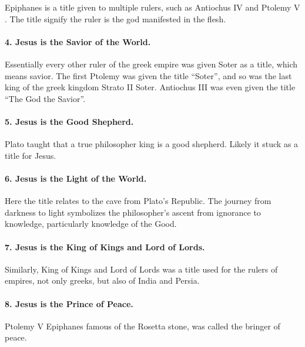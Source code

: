 Epiphanes is a title given to multiple rulers, such as Antiochus IV and Ptolemy V .
The title signify the ruler is the god manifested in the flesh.

\paragraph{4.
Jesus is the Savior of the World.}\label{par:jesus-is-the-savior-of-the-world.}

Essentially every other ruler of the greek empire was given Soter as a title, which means savior.
The first Ptolemy was given the title ``Soter'', and so was the last king of the greek kingdom Strato II Soter.
Antiochus III was even given the title ``The God the Savior''.

\paragraph{5.
Jesus is the Good Shepherd.}\label{par:jesus-is-the-good-shepherd.}

Plato taught that a true philosopher king is a good shepherd.
Likely it stuck as a title for Jesus.

\paragraph{6.
Jesus is the Light of the World.}\label{par:jesus-is-the-light-of-the-world.}

Here the title relates to the cave from Plato's Republic.
The journey from darkness to light symbolizes the philosopher's ascent from ignorance to knowledge, particularly knowledge of the Good.

\paragraph{7.
Jesus is the King of Kings and Lord of Lords.}\label{par:jesus-is-the-king-of-kings-and-lord-of-lords.}

Similarly, King of Kings and Lord of Lords was a title used for the rulers of empires, not only greeks, but also of India and Persia.

\paragraph{8.
Jesus is the Prince of Peace.}\label{par:jesus-is-the-prince-of-peace.}

Ptolemy V Epiphanes famous of the Rosetta stone, was called the bringer of peace.

